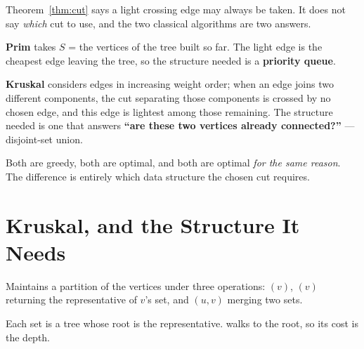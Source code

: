 \begin{conceptbox}
Theorem~\ref{thm:cut} says a light crossing edge may always be taken. It does
not say \emph{which} cut to use, and the two classical algorithms are two
answers.

\smallskip
\textbf{Prim} takes $S$ = the vertices of the tree built so far. The light edge
is the cheapest edge leaving the tree, so the structure needed is a
\textbf{priority queue}.

\smallskip
\textbf{Kruskal} considers edges in increasing weight order; when an edge joins
two different components, the cut separating those components is crossed by no
chosen edge, and this edge is lightest among those remaining. The structure
needed is one that answers \textbf{``are these two vertices already
connected?''} --- disjoint-set union.

\smallskip
Both are greedy, both are optimal, and both are optimal \emph{for the same
reason}. The difference is entirely which data structure the chosen cut
requires.
\end{conceptbox}

\section{Kruskal, and the Structure It Needs}


\begin{definitionbox}
Maintains a partition of the vertices under three operations:
$(v)$, $(v)$ returning the representative of
$v$'s set, and $(u,v)$ merging two sets.

\smallskip
Each set is a tree whose root is the representative.  walks to
the root, so its cost is the depth.
\end{definitionbox}

